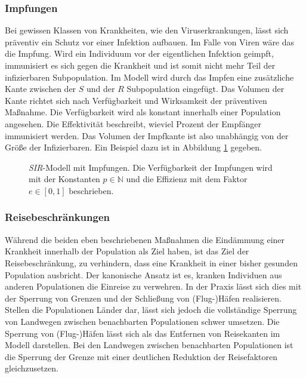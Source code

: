 \subsubsection{Impfungen}
Bei gewissen Klassen von Krankheiten, wie den Viruserkrankungen, lässt sich präventiv ein Schutz vor einer Infektion aufbauen. Im Falle von Viren wäre das die Impfung. Wird ein Individuum vor der eigentlichen Infektion geimpft, immunisiert es sich gegen die Krankheit und ist somit nicht mehr Teil der infizierbaren Subpopulation. Im Modell wird durch das Impfen eine zusätzliche Kante zwischen der $S$ und der $R$ Subpopulation eingefügt. Das Volumen der Kante richtet sich nach Verfügbarkeit und Wirksamkeit der präventiven Maßnahme. Die Verfügbarkeit wird als konstant innerhalb einer Population angesehen. Die Effektivität beschreibt, wieviel Prozent der Empfänger immunisiert werden. Das Volumen der Impfkante ist also unabhängig von der Größe der Infizierbaren. Ein Beispiel dazu ist in Abbildung \ref{fig:ssec:actions:vac} gegeben.
\begin{figure}
\begin{center}
\end{center}
\caption{\emph{SIR}-Modell mit Impfungen. Die Verfügbarkeit der Impfungen wird mit der Konstanten $p\in\mathbb{N}$ und die Effizienz mit dem Faktor $e\in[0,1]$ beschrieben.}\label{fig:ssec:actions:vac}
\end{figure}


\subsubsection{Reisebeschränkungen}
Während die beiden eben beschriebenen Maßnahmen die Eindämmung einer Krankheit innerhalb der Population als Ziel haben, ist das Ziel der Reisebeschränkung, zu verhindern, dass eine Krankheit in einer bisher gesunden Population ausbricht. Der kanonische Ansatz ist es, kranken Individuen aus anderen Populationen die Einreise zu verwehren. In der Praxis lässt sich dies mit der Sperrung von Grenzen und der Schließung von (Flug-)Häfen realisieren. Stellen die Populationen Länder dar, lässt sich jedoch die vollständige Sperrung von Landwegen zwischen benachbarten Populationen schwer umsetzen. Die Sperrung von (Flug-)Häfen lässt sich als das Entfernen von Reisekanten im Modell darstellen. Bei den Landwegen zwischen benachbarten Populationen ist die Sperrung der Grenze mit einer deutlichen Reduktion der Reisefaktoren gleichzusetzen. 

